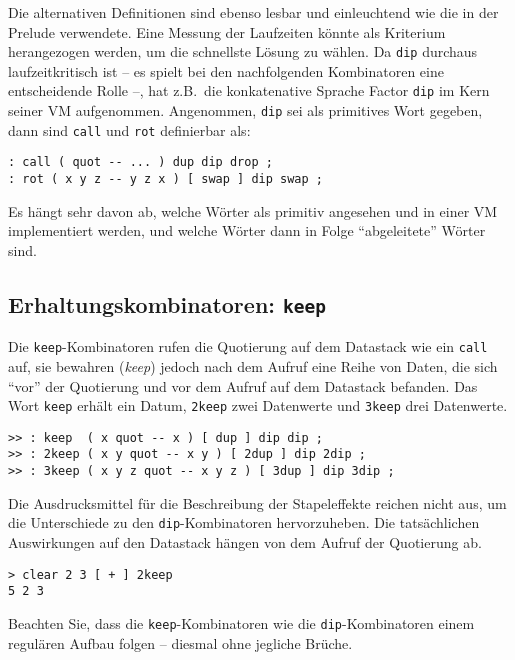 Die alternativen Definitionen sind ebenso lesbar und einleuchtend wie die in der Prelude verwendete. Eine Messung der Laufzeiten könnte als Kriterium herangezogen werden, um die schnellste Lösung zu wählen. Da \verb|dip| durchaus laufzeitkritisch ist -- es spielt bei den nachfolgenden Kombinatoren eine entscheidende Rolle --, hat z.B.\ die konkatenative Sprache Factor \verb|dip| im Kern seiner VM aufgenommen. Angenommen, \verb|dip| sei als primitives Wort gegeben, dann sind \verb|call| und \verb|rot| definierbar als:

\begin{verbatim}
: call ( quot -- ... ) dup dip drop ;
: rot ( x y z -- y z x ) [ swap ] dip swap ;
\end{verbatim}

Es hängt sehr davon ab, welche Wörter als primitiv angesehen und in einer VM implementiert werden, und welche Wörter dann in Folge "`abgeleitete"' Wörter sind.

\subsection{Erhaltungskombinatoren: \texttt{keep}}

Die \verb|keep|-Kombinatoren rufen die Quotierung auf dem Datastack wie ein \verb|call| auf, sie bewahren (\emph{keep}) jedoch nach dem Aufruf eine Reihe von Daten, die sich "`vor"' der Quotierung und vor dem Aufruf auf dem Datastack befanden. Das Wort \verb|keep| erhält ein Datum, \verb|2keep| zwei Datenwerte und \verb|3keep| drei Datenwerte.

\begin{verbatim}
>> : keep  ( x quot -- x ) [ dup ] dip dip ;
>> : 2keep ( x y quot -- x y ) [ 2dup ] dip 2dip ;
>> : 3keep ( x y z quot -- x y z ) [ 3dup ] dip 3dip ;
\end{verbatim}

Die Ausdrucksmittel für die Beschreibung der Stapeleffekte reichen nicht aus, um die Unterschiede zu den \verb|dip|-Kombinatoren hervorzuheben. Die tatsächlichen Auswirkungen auf den Datastack hängen von dem Aufruf der Quotierung ab.

\begin{verbatim}
> clear 2 3 [ + ] 2keep
5 2 3
\end{verbatim}

Beachten Sie, dass die \verb|keep|-Kombinatoren wie die \verb|dip|-Kombinatoren einem regulären Aufbau folgen -- diesmal ohne jegliche Brüche.

